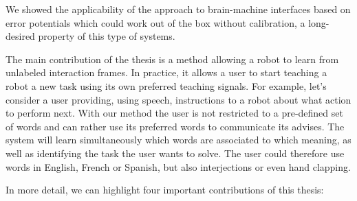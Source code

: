We showed the applicability of the approach to brain-machine interfaces based on error potentials which could work out of the box without calibration, a long-desired property of this type of systems. 


The main contribution of the thesis is a method allowing a robot to learn from unlabeled interaction frames. In practice, it allows a user to start teaching a robot a new task using its own preferred teaching signals. For example, let's consider a user providing, using speech, instructions to a robot about what action to perform next. With our method the user is not restricted to a pre-defined set of words and can rather use its preferred words to communicate its advises. The system will learn simultaneously which words are associated to which meaning, as well as identifying the task the user wants to solve. The user could therefore use words in English, French or Spanish, but also interjections or even hand clapping.

In more detail, we can highlight four important contributions of this thesis:

